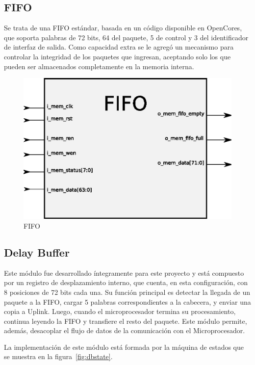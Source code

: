 \subsection{FIFO}
Se trata de una FIFO estándar, basada en un código disponible en OpenCores\cite{fifo}, que soporta palabras de 72 bits, 64 del paquete, 5 de control y 3 del identificador de interfaz de salida. Como capacidad extra se le agregó un mecanismo para controlar la integridad de los paquetes que ingresan, aceptando solo los que pueden ser almacenados completamente en la memoria interna. 

\begin{figure}[H]
  \centering
	\includegraphics[scale=0.50]{3-arquitectura/graf/bloqfifo.eps}
  \caption{FIFO}
  \label{fig:gen}
\end{figure}

\subsection{Delay Buffer}
Este módulo fue desarrollado íntegramente para este proyecto y está compuesto por un registro de desplazamiento interno, que cuenta, en esta configuración, con 8 posiciones de 72 bits cada una. Su función principal es detectar la llegada de un paquete a la FIFO, cargar 5 palabras correspondientes a la cabecera, y enviar una copia a Uplink. Luego, cuando el microprocesador termina su procesamiento, continua leyendo la FIFO y transfiere el resto del paquete. Este módulo permite, además, desacoplar el flujo de datos de la comunicación con el Microprocesador.

La implementación de este módulo está formada por la máquina de estados que se muestra en la figura~\ref{fig:dbstate}.

